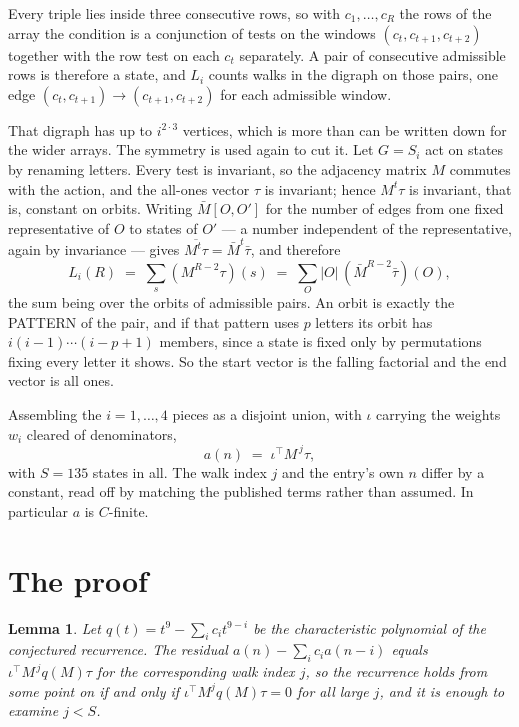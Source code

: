 \documentclass[11pt,a4paper]{article}
\theoremstyle{plain}
\newtheorem{lemma}[theorem]{Lemma}
\theoremstyle{definition}
\begin{document}
Every triple lies inside three consecutive rows, so with $c_1,\dots,c_R$ the rows of the array
the condition is a conjunction of tests on the windows $(c_{t},c_{t+1},c_{t+2})$ together
with the row test on each $c_t$ separately. A pair of consecutive admissible rows is therefore
a state, and $L_i$ counts walks in the digraph on those pairs, one edge $(c_t,c_{t+1})\to
(c_{t+1},c_{t+2})$ for each admissible window.

That digraph has up to $i^{2\cdot3}$ vertices, which is more than can be written down for
the wider arrays. The symmetry is used again to cut it. Let $G=S_i$ act on states by renaming
letters. Every test is invariant, so the adjacency matrix $M$ commutes with the action, and the
all-ones vector $\tau$ is invariant; hence $M^{t}\tau$ is invariant, that is, constant on
orbits. Writing $\bar M[O,O']$ for the number of edges from one fixed representative of $O$ to
states of $O'$ --- a number independent of the representative, again by invariance --- gives
$\overline{M^{t}\tau}=\bar M^{t}\bar\tau$, and therefore
\[
L_i(R)\;=\;\sum_{s}(M^{R-2}\tau)(s)\;=\;\sum_{O}|O|\,(\bar M^{R-2}\bar\tau)(O),
\]
the sum being over the orbits of admissible pairs. An orbit is exactly the PATTERN of the pair,
and if that pattern uses $p$ letters its orbit has $i(i-1)\cdots(i-p+1)$ members, since a state
is fixed only by permutations fixing every letter it shows. So the start vector is the falling
factorial and the end vector is all ones.

Assembling the $i=1,\dots,4$ pieces as a disjoint union, with $\iota$ carrying the weights
$w_i$ cleared of denominators,
\[
a(n)\;=\;\iota^{\!\top}M^{\,j}\tau ,
\]
with $S=135$ states in all. The walk index $j$ and the entry's own $n$ differ by a constant,
read off by matching the published terms rather than assumed. In particular $a$ is $C$-finite.

\section{The proof}

\begin{lemma}\label{lem:crit}
Let $q(t)=t^{9}-\sum_i c_it^{9-i}$ be the characteristic polynomial of the
conjectured recurrence. The residual $a(n)-\sum_ic_ia(n-i)$ equals
$\iota^{\!\top}M^{\,j}q(M)\tau$ for the corresponding walk index $j$, so the recurrence
holds from some point on if and only if $\iota^{\!\top}M^{j}q(M)\tau=0$ for all large $j$,
and it is enough to examine $j<S$.
\end{lemma}
\end{document}
